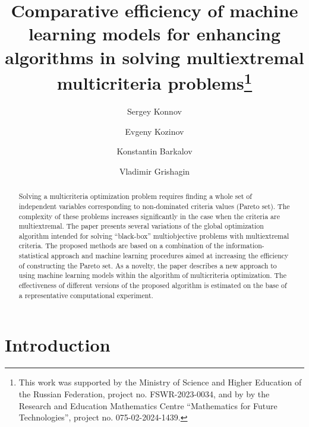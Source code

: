 \documentclass[runningheads]{llncs}
\begin{document}
%
\title{Comparative efficiency of machine learning models for enhancing algorithms in solving multiextremal multicriteria problems\thanks{This work was supported by the Ministry of Science and Higher Education of the Russian Federation, project no. FSWR-2023-0034, and by by the Research and Education Mathematics Centre ``Mathematics for Future Technologies'', project no. 075-02-2024-1439.} }
%
%
\author{Sergey Konnov \and
Evgeny Kozinov \Letter{} \and
Konstantin Barkalov \Letter{} \and
Vladimir Grishagin}
%

%
\maketitle

%
\begin{abstract}
Solving a multicriteria optimization problem requires finding a whole set of independent variables corresponding to non-dominated criteria values (Pareto set). The complexity of these problems increases significantly in the case when the criteria are multiextremal. The paper presents several variations of the global optimization algorithm intended for solving ``black-box'' multiobjective problems with multiextremal criteria. The proposed methods are based on a combination of the information-statistical approach and machine learning procedures aimed at increasing the efficiency of constructing the Pareto set. As a novelty, the paper describes a new approach to using machine learning models within the algorithm of multicriteria optimization. The effectiveness of different versions of the proposed algorithm is estimated on the base of a representative computational experiment.

\end{abstract}
%
%
%
\section{Introduction}
\label{sec:1}
\end{document}
